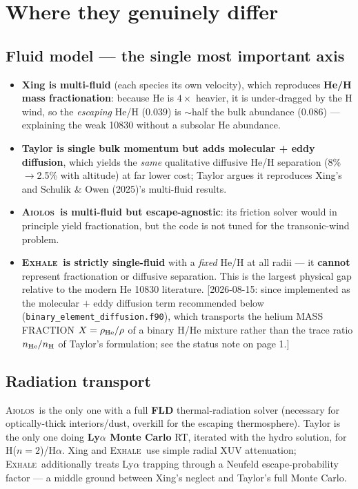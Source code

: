 \documentclass[11pt]{article}
\newcommand{\EXHALE}{\textsc{Exhale}}
\newcommand{\AIOLOS}{\textsc{Aiolos}}
\begin{document}
\section{Where they genuinely differ}

\subsection{Fluid model --- the single most important axis}
\begin{itemize}[nosep]
  \item \textbf{Xing is multi-fluid} (each species its own velocity), which reproduces
    \textbf{He/H mass fractionation}: because He is $4\times$ heavier, it is under-dragged by
    the H wind, so the \emph{escaping} He/H ($0.039$) is $\sim$half the bulk abundance
    ($0.086$) --- explaining the weak 10830 without a subsolar He abundance.
  \item \textbf{Taylor is single bulk momentum but adds molecular + eddy diffusion}, which
    yields the \emph{same} qualitative diffusive He/H separation (8\%$\to$2.5\% with
    altitude) at far lower cost; Taylor argues it reproduces Xing's and Schulik \& Owen
    (2025)'s multi-fluid results.
  \item \textbf{\AIOLOS\ is multi-fluid but escape-agnostic}: its friction solver would in
    principle yield fractionation, but the code is not tuned for the transonic-wind problem.
  \item \textbf{\EXHALE\ is strictly single-fluid} with a \emph{fixed} He/H at all radii ---
    it \textbf{cannot} represent fractionation or diffusive separation. This is the largest
    physical gap relative to the modern He 10830 literature. [2026-08-15: since
    implemented as the molecular $+$ eddy diffusion term recommended below
    (\texttt{binary\_element\_diffusion.f90}), which transports the helium MASS
    FRACTION $X=\rho_{\rm He}/\rho$ of a binary H/He mixture rather than the trace
    ratio $n_{\rm He}/n_{\rm H}$ of Taylor's formulation; see the status note on
    page 1.]
\end{itemize}

\subsection{Radiation transport}
\AIOLOS\ is the only one with a full \textbf{FLD} thermal-radiation solver (necessary for
optically-thick interiors/dust, overkill for the escaping thermosphere). Taylor is the only
one doing \textbf{Ly$\alpha$ Monte Carlo} RT, iterated with the hydro solution, for
H($n{=}2$)/H$\alpha$. Xing and \EXHALE\ use simple radial XUV attenuation; \EXHALE\
additionally treats Ly$\alpha$ trapping through a Neufeld escape-probability factor --- a
middle ground between Xing's neglect and Taylor's full Monte Carlo.
\end{document}
